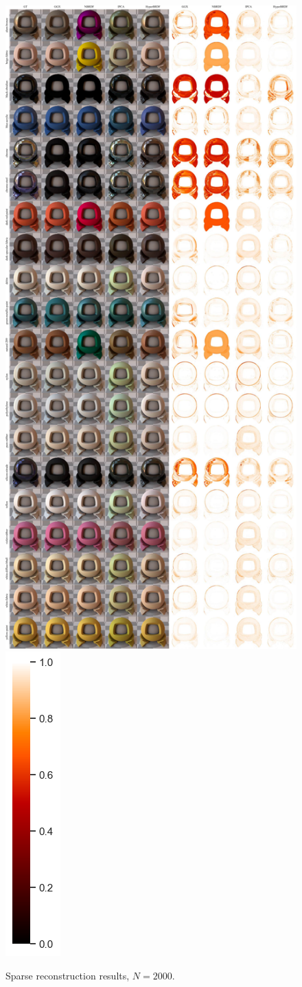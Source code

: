 \begin{figure}[ht]
  \centering

  {\includegraphics[width=0.65\linewidth]{Chapters/appendix-figs/supp_2000-compressed.pdf}}
  {\includegraphics[width=0.02\linewidth]{Chapters/hyperbrdf-figs/vbar.png}}
   \caption{Sparse reconstruction results, $N = 2000$.}
   \label{fig:2000}
\end{figure}

